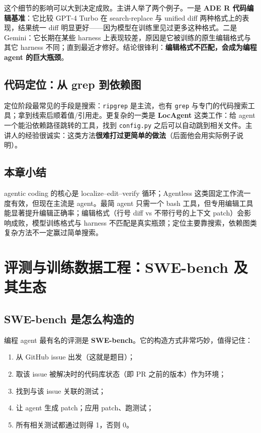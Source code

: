 ﻿\documentclass[a4paper]{article}
\begin{document}
这个细节的影响可以大到决定成败。主讲人举了两个例子。一是 \textbf{ADE R 代码编辑基准}：它比较 GPT-4 Turbo 在 search-replace 与 unified diff 两种格式上的表现，结果统一 diff 明显更好——因为模型在训练里见过更多这种格式。二是 Gemini：它长期在某些 harness 上表现较差，原因是它被训练的原生编辑格式与其它 harness 不同；直到最近才修好。结论很锋利：\textbf{编辑格式不匹配，会成为编程 agent 的巨大瓶颈}。

\subsection{代码定位：从 grep 到依赖图}

定位阶段最常见的手段是搜索：\texttt{ripgrep} 是主流，也有 \texttt{grep} 与专门的代码搜索工具；拿到线索后顺着值/引用走。更复杂的一类是 \textbf{LocAgent} 这类工作：给 agent 一个能沿依赖路径跳转的工具，找到 \texttt{config.py} 之后可以自动跳到相关文件。主讲人的经验很诚实：这类方法\textbf{很难打过更简单的做法}（后面他会用实际例子说明）。

\subsection{本章小结}
agentic coding 的核心是 localize--edit--verify 循环；Agentless 这类固定工作流一度有效，但现在主流是 agent。最简 agent 只需一个 bash 工具，但专用编辑工具能显著提升编辑正确率；编辑格式（行号 diff vs 不带行号的上下文 patch）会影响成败，模型训练格式与 harness 不匹配是真实瓶颈；定位主要靠搜索，依赖图类复杂方法不一定赢过简单搜索。

\section{评测与训练数据工程：SWE-bench 及其生态}

\subsection{SWE-bench 是怎么构造的}

编程 agent 最有名的评测是 \textbf{SWE-bench}。它的构造方式非常巧妙，值得记住：

\begin{enumerate}
\item 从 GitHub issue 出发（这就是题目）；
\item 取该 issue 被解决时的代码库状态（即 PR 之前的版本）作为环境；
\item 找到与该 issue 关联的测试；
\item 让 agent 生成 patch；应用 patch、跑测试；
\item 所有相关测试都通过则得 1，否则 0。
\end{enumerate}
\end{document}
